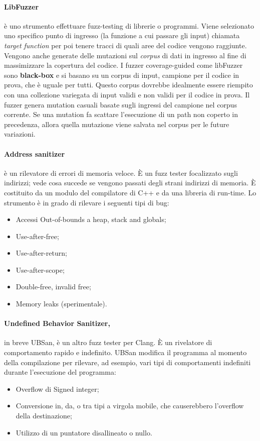 \paragraph{LibFuzzer} è uno strumento effettuare fuzz-testing di librerie o programmi.
Viene selezionato uno specifico punto di ingresso (la funzione a cui passare gli input)
chiamata \textit{target function} per poi tenere tracci di quali aree del codice
vengono raggiunte. Vengono anche generate delle mutazioni sul
\textit{corpus} di dati in ingresso al fine di massimizzare la copertura del codice.
I fuzzer coverage-guided come libFuzzer sono \textbf{black-box} e si basano su un
corpus di input,
campione per il codice in prova, che è uguale per tutti.
Questo corpus dovrebbe idealmente essere riempito con una collezione variegata di input
validi e non validi per il codice in prova.
Il fuzzer genera mutation casuali basate sugli ingressi del campione nel corpus corrente.
Se una mutation fa scattare l'esecuzione di un path non coperto in precedenza,
allora quella mutazione viene salvata nel corpus per le future variazioni.

\paragraph{Address sanitizer} è un rilevatore di errori di memoria veloce.
È un fuzz tester focalizzato sugli indirizzi; vede cosa succede se vengono passati degli
strani indirizzi di memoria.
È costituito da un modulo del compilatore di C++ e da una libreria di run-time.
Lo strumento è in grado di rilevare i seguenti tipi di bug:

\begin{itemize}
    \item Accessi Out-of-bounds a heap, stack and globals;
    \item Use-after-free;
    \item Use-after-return;
    \item Use-after-scope;
    \item Double-free, invalid free;
    \item Memory leaks (sperimentale).
\end{itemize}

\paragraph{Undefined Behavior Sanitizer,} in breve UBSan, è un altro fuzz tester per Clang.
È un rivelatore di comportamento rapido e indefinito.
UBSan modifica il programma al momento della compilazione per rilevare, ad esempio,
vari tipi di comportamenti indefiniti durante l'esecuzione del programma:

\begin{itemize}
    \item Overflow di Signed integer;
    \item Conversione in, da, o tra tipi a virgola mobile, che causerebbero l’overflow della
          destinazione;
    \item Utilizzo di un puntatore disallineato o nullo.
\end{itemize}